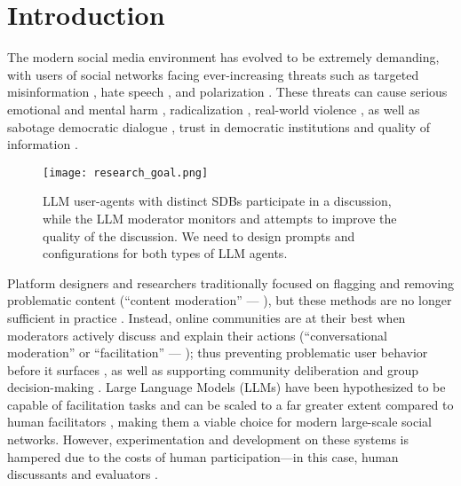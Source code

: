 %
\section{Introduction}
\label{sec:introduction}

The modern social media environment has evolved to be extremely demanding, with users of social networks facing ever-increasing threats such as targeted misinformation \cite{clemons2025disinformation, Denniss2025Social}, hate speech \cite{kolluri2025parler}, and polarization \cite{pranesh2024impactsocialmediapolarization}. These threats can cause serious emotional and mental harm \citep{proactive_moderation}, radicalization \citep{cho-etal-2024-language}, real-world violence \citep{schaffner_community_guidelines}, as well as sabotage democratic dialogue \citep{esau2017design, falk-etal-2021-predicting, seering_self_moderation}, trust in democratic institutions \citep{schroeder-etal-2024-fora} and quality of information \citep{make_reddit_great}.

\begin{figure}[t]
	\centering
	\texttt{[image: research\_goal.png]}
	\caption{LLM user-agents with distinct SDBs participate in a discussion, while the LLM moderator monitors and attempts to improve the quality of the discussion. We need to design prompts and configurations for both types of LLM agents.}
	\label{fig::goals}
\end{figure}

Platform designers and researchers traditionally focused on flagging and removing problematic content (``content moderation'' --- \citet{seering_self_moderation, cresci_pesonalized_interventions}), but these methods are no longer sufficient in practice \cite{horta_automated_moderation, schaffner_community_guidelines, small-polis-llm, korre2025evaluation}. Instead, online communities are at their best when moderators actively discuss and explain their actions (``conversational moderation'' or ``facilitation'' --- \citet{argyle2023, korre2025evaluation, falk-etal-2021-predicting}); thus preventing problematic user behavior before it surfaces \cite{cho-etal-2024-language, seering_self_moderation, cresci_pesonalized_interventions, make_reddit_great}, as well as supporting community deliberation and group decision-making \cite{kim_et_al_chatbot, seering_self_moderation}. Large Language Models (LLMs) have been hypothesized to be capable of facilitation tasks and can be scaled to a far greater extent compared to human facilitators \cite{korre2025evaluation, small-polis-llm}, making them a viable choice for modern large-scale social networks. However, experimentation and development on these systems is hampered due to the costs of human participation---in this case, human discussants and evaluators \citep{rossi_2024}. 

